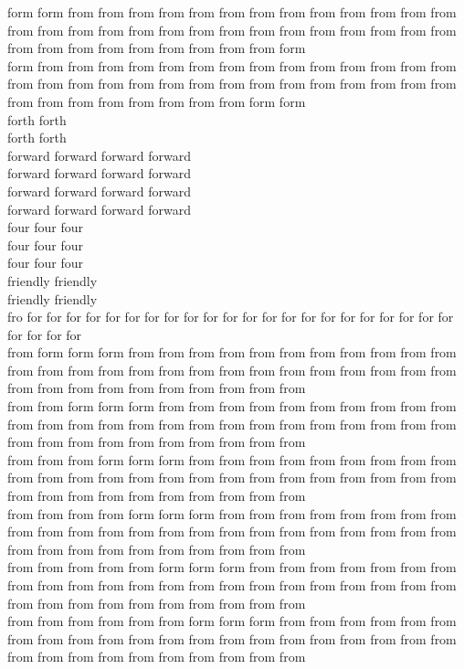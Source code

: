 form form from from from from from from from from from from from from from from from from from from from from from from from from from from from from from from from from from from from from from form\\
form from from from from from from from from from from from from from from from from from from from from from from from from from from from from from from from from from from from from from form form\\
forth forth\\
forth forth\\
forward forward forward forward\\
forward forward forward forward\\
forward forward forward forward\\
forward forward forward forward\\
four four four\\
four four four\\
four four four\\
friendly friendly\\
friendly friendly\\
fro for for for for for for for for for for for for for for for for for for for for for for for for for for\\
from form form form from from from from from from from from from from from from from from from from from from from from from from from from from from from from from from from from from from from from\\
from from form form form from from from from from from from from from from from from from from from from from from from from from from from from from from from from from from from from from from from\\
from from from form form form from from from from from from from from from from from from from from from from from from from from from from from from from from from from from from from from from from\\
from from from from form form form from from from from from from from from from from from from from from from from from from from from from from from from from from from from from from from from from\\
from from from from from form form form from from from from from from from from from from from from from from from from from from from from from from from from from from from from from from from from\\
from from from from from from form form form from from from from from from from from from from from from from from from from from from from from from from from from from from from from from from from\\
